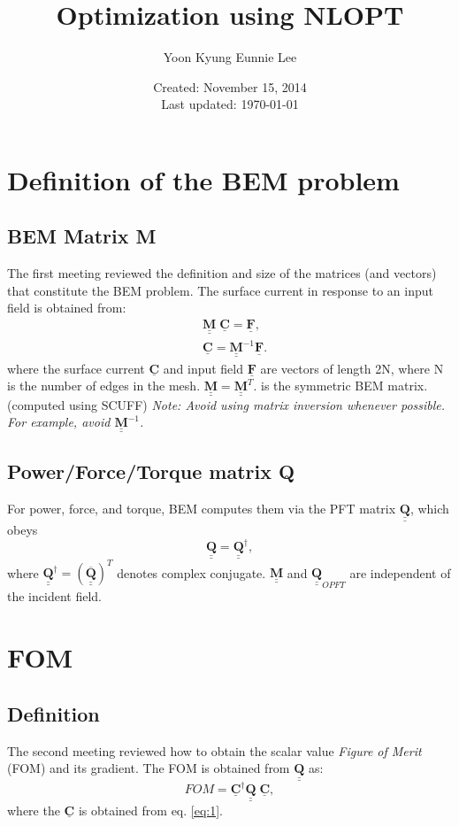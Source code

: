 \documentclass[11pt,letterpaper]{article}
\author{Yoon Kyung Eunnie Lee}
\title{Optimization using NLOPT}
\date{Created: November 15, 2014 \\ Last updated: \today}
\newcommand{\Qmat}{\underline{\underline{\mathbf{Q}}}}
\newcommand{\Mmat}{\underline{\underline{\mathbf{M}}}}
\newcommand{\Cvec}{\underline{\mathbf{C}}}
\newcommand{\Fvec}{\underline{\mathbf{F}}}
\begin{document}
\maketitle
\begin{multicols}{2}
\section{\large{Definition of the BEM problem}}
\subsection*{BEM Matrix M}
The first meeting reviewed the definition and size of the matrices (and vectors) that constitute the BEM problem.
The surface current in response to an input field is obtained from: 
\begin{subequations} 
	\begin{align}
		&\Mmat\; \Cvec =\Fvec,		\label{eq:1}\\
		&\Cvec=\Mmat^{-1} \Fvec. 	\label{eq:current}		
	\end{align}	
\end{subequations}
where the surface current $\Cvec$ and input field $\Fvec$ are vectors of length 2N, where N is the number of edges in the mesh. $ \Mmat = \Mmat^{T}. $  is the symmetric BEM matrix. (computed using SCUFF) 
\textit{Note: Avoid using matrix inversion whenever possible. For example, avoid $\Mmat^{-1}$. }
	\subsection*{Power/Force/Torque matrix Q}
For power, force, and torque, BEM computes them via the PFT matrix $\Qmat$, which obeys \[\Qmat=\Qmat^{\dagger},\] where $\Qmat^{\dagger} = (\overline{\Qmat})^{T}$ denotes complex conjugate. $\Mmat$ and $\Qmat_{OPFT}$ are independent of the incident field.

 	\section{\large{FOM}}
 	\subsection*{Definition}
The second meeting reviewed how to obtain the scalar value \textit{Figure of Merit} (FOM) and its gradient. The FOM is obtained from $\Qmat$ as:
\begin{equation} 	\label{eq:FOM}
	FOM = \Cvec^{\dagger}\Qmat\;\Cvec,
\end{equation}
where the $\Cvec$ is obtained from eq. \ref{eq:1}. 

\end{multicols}
\end{document}
